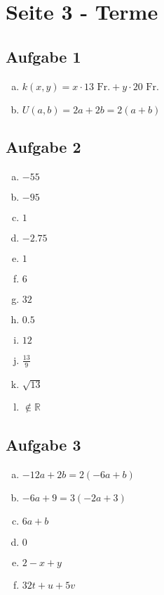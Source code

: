 
\newif\ifisTALS
\newif\ifisGESO
\newif\ifisTRAINER






\renewcommand{\doctitel}{Dossier.algebra}
\renewcommand{\fachthema}{  Lösungen}

\scriptStart{}

\section*{Seite 3 - Terme}

\subsection*{Aufgabe 1}
\begin{enumerate}[a)]
	\item $k(x,y)=x\cdot 13 \text{\ Fr.} + y\cdot 20 \text{\ Fr.}$
	\item $U(a,b) = 2a+2b = 2(a+b)$
\end{enumerate}

\subsection*{Aufgabe 2}
\begin{multicols}{3}
	\begin{enumerate}[a)]
		\item $-55$
		\item $-95$
		\item $1$
		\item $-2.75$
		\item $1$
		\item $6$
		\item $32$
		\item $0.5$
		\item $12$
		\item $\frac{13}{9}$
		\item $\sqrt{13}$
		\item $\notin \mathbb{R}$
	\end{enumerate}
\end{multicols}

\subsection*{Aufgabe 3}
\begin{multicols}{2}
	\begin{enumerate}[a)]
		\item $-12a+2b = 2(-6a+b)$
		\item $-6a+9 = 3(-2a+3)$
		\item $6a+b$
		\item $0$
		\item $2-x+y$
		\item $32t+u+5v$
	\end{enumerate}
\end{multicols}

